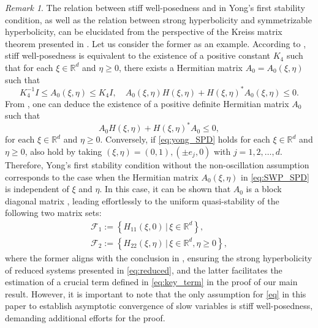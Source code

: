 \documentclass{article}
\theoremstyle{plain}%
\theoremstyle{definition}%
\theoremstyle{remark}%
\newtheorem{remark}{Remark}%
\newcommand{\bR}{\mathbb{R}}
\newcommand{\cF}{\mathcal{F}}
\newcommand{\+}[1]{{\bm{#1}}}
\begin{document}
\begin{remark}\label{rmk:yong->SWP}
  The relation between stiff well-posedness and
   in Yong's first stability condition, 
  as well as the relation between strong hyperbolicity and 
  symmetrizable hyperbolicity, can be elucidated from the perspective 
  of the Kreiss matrix theorem presented in . 
  Let us consider the former as an example.
  According to , stiff well-posedness is equivalent to  
  the existence of a positive constant $K_4$ such that for each 
  $\xi \in \bR^d$ and $\eta \ge 0$, there exists a Hermitian matrix 
  $A_0 = A_0(\xi, \eta)$ such that 
  \begin{equation}\label{eq:SWP_SPD}
    K_4^{-1} I \le A_0(\xi, \eta) \le K_4 I, \quad 
    A_0(\xi, \eta) H(\xi, \eta) + H(\xi, \eta)^* A_0(\xi, \eta) \le 0.
  \end{equation}
  From , one can deduce the existence of 
  a positive definite Hermitian matrix $A_0$ such that 
  \begin{equation}\label{eq:yong_SPD}
    A_0 H(\xi, \eta) + H(\xi, \eta)^* A_0 \le 0,
  \end{equation}
  for each $\xi \in \bR^d$ and $\eta \ge 0$.
  Conversely, if \cref{eq:yong_SPD} holds for each $\xi \in \bR^d$ 
  and $\eta \ge 0$,  also hold by taking 
  $(\xi, \eta) = (0, 1), (\pm e_j, 0)$ with $j = 1, 2, \ldots, d$.
  Therefore, Yong's first stability condition without the 
  non-oscillation assumption corresponds to the case when the 
  Hermitian matrix $A_0(\xi, \eta)$ in \cref{eq:SWP_SPD} is 
  independent of $\xi$ and $\eta$. 
  In this case, it can be shown that $A_0$ is a block diagonal matrix 
  \cite[Lemma 2.1]{Yong_singular_1999}, leading effortlessly to the 
  uniform quasi-stability of the following two matrix sets:
  \begin{gather}
    \label{eq:F1}
    \cF_1 := \left\{ H_{11}(\xi, 0) \,\big|\, \xi \in \bR^d \right\},
    \\
    \label{eq:F2}
    \cF_2 := \left\{ H_{22}(\xi, \eta) \,\big|\, 
    \xi \in \bR^d, \eta \ge 0 \right\},
  \end{gather}
  where the former aligns with the conclusion in 
  ,
  ensuring the strong hyperbolicity of reduced systems presented in 
  \cref{eq:reduced}, and the latter facilitates the estimation of
  a crucial term defined in \cref{eq:key_term} in the proof of our 
  main result. 
  However, it is important to note that 
  the only assumption for \cref{eq} in this paper to 
  establish asymptotic convergence of slow variables is stiff 
  well-posedness, demanding additional efforts for the proof.
\end{remark}
\end{document}
